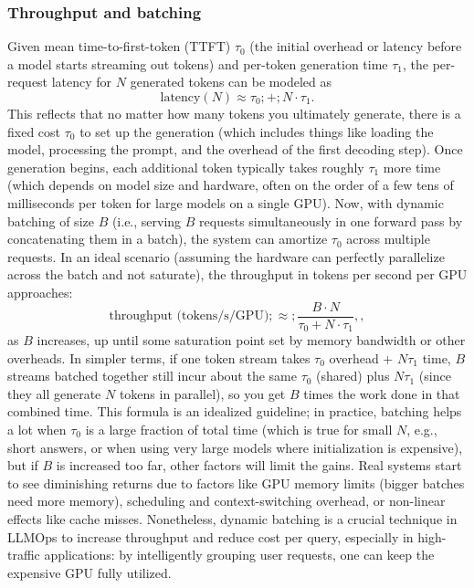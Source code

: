 \subsubsection{Throughput and batching}
Given mean time-to-first-token (TTFT) $\tau_0$ (the initial overhead or latency before a model starts streaming out tokens) and per-token generation time $\tau_1$, the per-request latency for $N$ generated tokens can be modeled as
\begin{equation}
\label{eq:latency}
\text{latency}(N) \approx \tau_0 ;+; N \cdot \tau_1.
\end{equation}
This reflects that no matter how many tokens you ultimately generate, there is a fixed cost $\tau_0$ to set up the generation (which includes things like loading the model, processing the prompt, and the overhead of the first decoding step). Once generation begins, each additional token typically takes roughly $\tau_1$ more time (which depends on model size and hardware, often on the order of a few tens of milliseconds per token for large models on a single GPU). Now, with dynamic batching of size $B$ (i.e., serving $B$ requests simultaneously in one forward pass by concatenating them in a batch), the system can amortize $\tau_0$ across multiple requests. In an ideal scenario (assuming the hardware can perfectly parallelize across the batch and not saturate), the throughput in tokens per second per GPU approaches:
\begin{equation}
\label{eq:throughput}
\text{throughput (tokens/s/GPU)} ;\approx; \frac{B \cdot N}{\tau_0 + N \cdot \tau_1},,
\end{equation}
as $B$ increases, up until some saturation point set by memory bandwidth or other overheads. In simpler terms, if one token stream takes $\tau_0$ overhead + $N \tau_1$ time, $B$ streams batched together still incur about the same $\tau_0$ (shared) plus $N \tau_1$ (since they all generate $N$ tokens in parallel), so you get $B$ times the work done in that combined time. This formula is an idealized guideline; in practice, batching helps a lot when $\tau_0$ is a large fraction of total time (which is true for small $N$, e.g., short answers, or when using very large models where initialization is expensive), but if $B$ is increased too far, other factors will limit the gains. Real systems start to see diminishing returns due to factors like GPU memory limits (bigger batches need more memory), scheduling and context-switching overhead, or non-linear effects like cache misses. Nonetheless, dynamic batching is a crucial technique in LLMOps to increase throughput and reduce cost per query, especially in high-traffic applications: by intelligently grouping user requests, one can keep the expensive GPU fully utilized.

